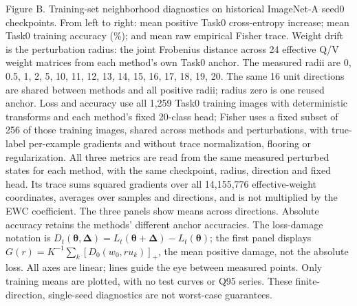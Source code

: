 \caption{Figure B. Training-set neighborhood diagnostics on historical ImageNet-A seed0 checkpoints. From left to right: mean positive Task0 cross-entropy increase; mean Task0 training accuracy (\%); and mean raw empirical Fisher trace. Weight drift is the perturbation radius: the joint Frobenius distance across 24 effective Q/V weight matrices from each method's own Task0 anchor. The measured radii are 0, 0.5, 1, 2, 5, 10, 11, 12, 13, 14, 15, 16, 17, 18, 19, 20. The same 16 unit directions are shared between methods and all positive radii; radius zero is one reused anchor. Loss and accuracy use all 1,259 Task0 training images with deterministic transforms and each method's fixed 20-class head; Fisher uses a fixed subset of 256 of those training images, shared across methods and perturbations, with true-label per-example gradients and without trace normalization, flooring or regularization. All three metrics are read from the same measured perturbed states for each method, with the same checkpoint, radius, direction and fixed head. Its trace sums squared gradients over all 14,155,776 effective-weight coordinates, averages over samples and directions, and is not multiplied by the EWC coefficient. The three panels show means across directions. Absolute accuracy retains the methods' different anchor accuracies. The loss-damage notation is $D_t(\boldsymbol{\theta},\boldsymbol{\Delta})=L_t(\boldsymbol{\theta}+\boldsymbol{\Delta})-L_t(\boldsymbol{\theta})$; the first panel displays $G(r)=K^{-1}\sum_k[D_0(w_0,ru_k)]_+$, the mean positive damage, not the absolute loss. All axes are linear; lines guide the eye between measured points. Only training means are plotted, with no test curves or Q95 series. These finite-direction, single-seed diagnostics are not worst-case guarantees.}
